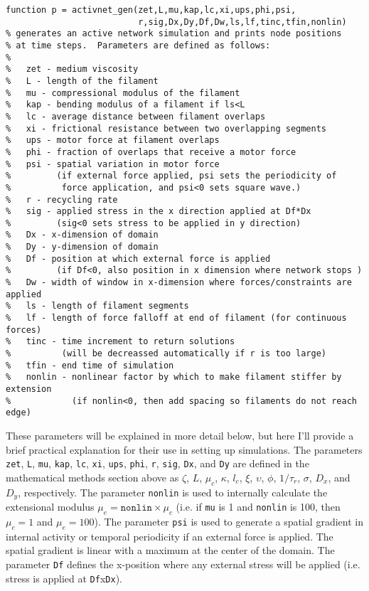 \begin{verbatim}
function p = activnet_gen(zet,L,mu,kap,lc,xi,ups,phi,psi,
                          r,sig,Dx,Dy,Df,Dw,ls,lf,tinc,tfin,nonlin)
% generates an active network simulation and prints node positions
% at time steps.  Parameters are defined as follows:
%
%   zet - medium viscosity
%   L - length of the filament
%   mu - compressional modulus of the filament
%   kap - bending modulus of a filament if ls<L
%   lc - average distance between filament overlaps
%   xi - frictional resistance between two overlapping segments
%   ups - motor force at filament overlaps
%   phi - fraction of overlaps that receive a motor force
%   psi - spatial variation in motor force 
%         (if external force applied, psi sets the periodicity of 
%          force application, and psi<0 sets square wave.)
%   r - recycling rate
%   sig - applied stress in the x direction applied at Df*Dx
%         (sig<0 sets stress to be applied in y direction)
%   Dx - x-dimension of domain
%   Dy - y-dimension of domain
%   Df - position at which external force is applied
%         (if Df<0, also position in x dimension where network stops )
%   Dw - width of window in x-dimension where forces/constraints are applied
%   ls - length of filament segments
%   lf - length of force falloff at end of filament (for continuous forces)
%   tinc - time increment to return solutions 
%          (will be decreassed automatically if r is too large)
%   tfin - end time of simulation
%   nonlin - nonlinear factor by which to make filament stiffer by extension
%            (if nonlin<0, then add spacing so filaments do not reach edge)
\end{verbatim}

These parameters will be explained in more detail below, but here I'll provide a brief practical explanation for their use in setting up simulations.  The parameters \texttt{zet}, \texttt{L}, \texttt{mu}, \texttt{kap}, \texttt{lc}, \texttt{xi}, \texttt{ups}, \texttt{phi}, \texttt{r}, \texttt{sig}, \texttt{Dx}, and \texttt{Dy} are defined in the mathematical methods section above as $\zeta$, $L$, $\mu_c$, $\kappa$, $l_c$, $\xi$, $\upsilon$, $\phi$, $1/\tau_r$, $\sigma$, $D_x$, and $D_y$, respectively. The parameter \texttt{nonlin} is used to internally calculate the extensional modulus $\mu_e = \texttt{nonlin} \times \mu_c$ (i.e. if \texttt{mu} is 1 and \texttt{nonlin} is 100, then $\mu_c=1$ and $\mu_e=100$).  The parameter \texttt{psi} is used to generate a spatial gradient in internal activity or temporal periodicity if an external force is applied. The spatial gradient is linear with a maximum at the center of the domain.  The parameter \texttt{Df} defines the x-position where any external stress will be applied (i.e. stress is applied at \texttt{Df}x\texttt{Dx}).

